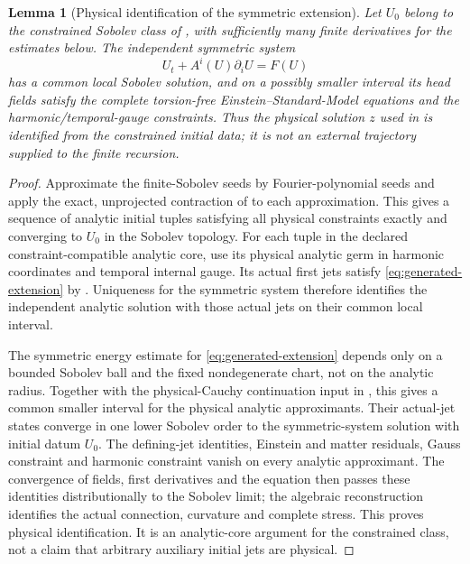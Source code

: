\documentclass[11pt]{article}
\numberwithin{equation}{section}
\newtheorem{lemma}[lemma]{Lemma}
\theoremstyle{definition}
\theoremstyle{remark}
\begin{document}
\begin{lemma}[Physical identification of the symmetric extension]
\label{lem:generated-physical-identification}
Let $U_0$ belong to the constrained Sobolev class of , with sufficiently many finite derivatives for the estimates below.  The independent symmetric system
\begin{equation}
 U_t+A^i(U)\partial_iU=F(U)
 \label{eq:generated-extension}
\end{equation}
has a common local Sobolev solution, and on a possibly smaller interval its head fields satisfy the complete torsion-free Einstein--Standard-Model equations and the harmonic/temporal-gauge constraints.  Thus the physical solution $z$ used in  is identified from the constrained initial data; it is not an external trajectory supplied to the finite recursion.
\end{lemma}
\begin{proof}
Approximate the finite-Sobolev seeds by Fourier-polynomial seeds and apply the exact, unprojected contraction of  to each approximation.  This gives a sequence of analytic initial tuples satisfying all physical constraints exactly and converging to $U_0$ in the Sobolev topology.  For each tuple in the declared constraint-compatible analytic core, use its physical analytic germ in harmonic coordinates and temporal internal gauge.  Its actual first jets satisfy \eqref{eq:generated-extension} by .  Uniqueness for the symmetric system therefore identifies the independent analytic solution with those actual jets on their common local interval.

The symmetric energy estimate for \eqref{eq:generated-extension} depends only on a bounded Sobolev ball and the fixed nondegenerate chart, not on the analytic radius.  Together with the physical-Cauchy continuation input in , this gives a common smaller interval for the physical analytic approximants.  Their actual-jet states converge in one lower Sobolev order to the symmetric-system solution with initial datum $U_0$.  The defining-jet identities, Einstein and matter residuals, Gauss constraint and harmonic constraint vanish on every analytic approximant.  The convergence of fields, first derivatives and the equation then passes these identities distributionally to the Sobolev limit; the algebraic reconstruction identifies the actual connection, curvature and complete stress.  This proves physical identification.  It is an analytic-core argument for the constrained class, not a claim that arbitrary auxiliary initial jets are physical.
\end{proof}
\end{document}
